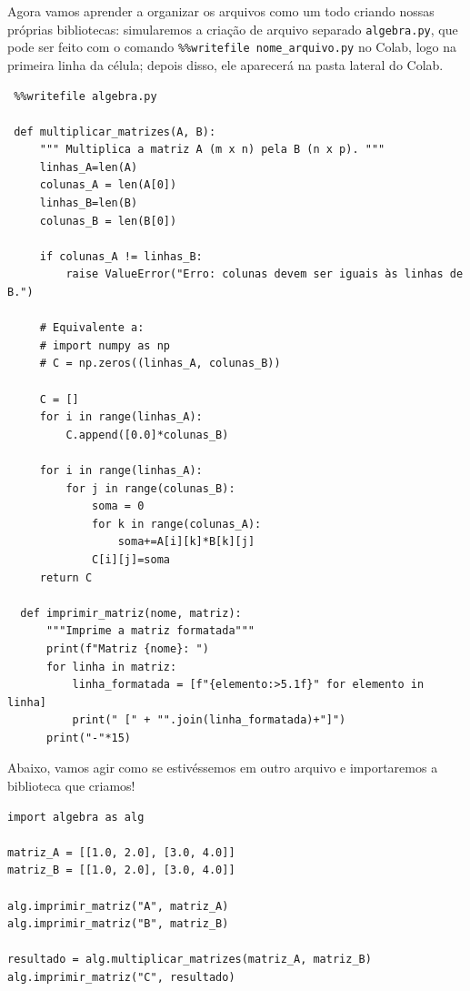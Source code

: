 \documentclass[../numerical_methods.tex]{subfiles}
\begin{document}
Agora vamos aprender a organizar os arquivos como um todo criando nossas próprias bibliotecas: simularemos a criação de arquivo separado \texttt{algebra.py}, que pode ser feito com o comando \texttt{\%\%writefile nome\_arquivo.py} no Colab, logo na primeira linha da célula; depois disso, ele aparecerá na pasta lateral do Colab.
\begin{listing}[H]
	\caption{Criação de módulo no Colab}
	\begin{verbatim}
 %%writefile algebra.py 

 def multiplicar_matrizes(A, B):
     """ Multiplica a matriz A (m x n) pela B (n x p). """
     linhas_A=len(A)
     colunas_A = len(A[0])
     linhas_B=len(B)
     colunas_B = len(B[0])

     if colunas_A != linhas_B:
         raise ValueError("Erro: colunas devem ser iguais às linhas de B.")
 
     # Equivalente a: 
     # import numpy as np 
     # C = np.zeros((linhas_A, colunas_B)) 
 
     C = []
     for i in range(linhas_A):
         C.append([0.0]*colunas_B)
 
     for i in range(linhas_A):
         for j in range(colunas_B):
             soma = 0
             for k in range(colunas_A):
                 soma+=A[i][k]*B[k][j]
             C[i][j]=soma
     return C

  def imprimir_matriz(nome, matriz):
      """Imprime a matriz formatada"""
      print(f"Matriz {nome}: ")
      for linha in matriz: 
          linha_formatada = [f"{elemento:>5.1f}" for elemento in linha]
          print(" [" + "".join(linha_formatada)+"]")
      print("-"*15) 
 \end{verbatim}
\end{listing}

Abaixo, vamos agir como se estivéssemos em outro arquivo e importaremos a biblioteca que criamos!
\begin{listing}[H]

	\begin{verbatim}
import algebra as alg 

matriz_A = [[1.0, 2.0], [3.0, 4.0]]
matriz_B = [[1.0, 2.0], [3.0, 4.0]]

alg.imprimir_matriz("A", matriz_A)
alg.imprimir_matriz("B", matriz_B)

resultado = alg.multiplicar_matrizes(matriz_A, matriz_B)
alg.imprimir_matriz("C", resultado)
\end{verbatim}
\end{listing}
\end{document}
